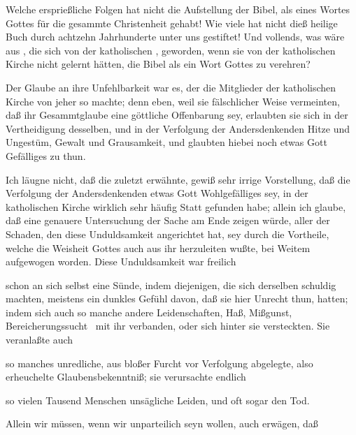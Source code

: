\begin{aufza}
\begin{aufzb}
\end{aufzb}
\item Welche ersprießliche Folgen hat nicht die Aufstellung der Bibel, als eines Wortes Gottes für die gesammte Christenheit gehabt! Wie viele  hat nicht dieß heilige Buch durch achtzehn Jahrhunderte unter uns gestiftet! Und vollends, was wäre aus , die sich von der katholischen , geworden, wenn sie von der katholischen Kirche nicht gelernt hätten, die Bibel als ein Wort Gottes zu verehren?~
\end{aufza}

 Der Glaube an ihre Unfehlbarkeit war es, der die Mitglieder der katholischen Kirche von jeher so  machte; denn eben, weil sie fälschlicher Weise vermeinten, daß ihr Gesammtglaube eine göttliche Offenbarung sey, erlaubten sie sich in der Vertheidigung desselben, und in der Verfolgung der Andersdenkenden Hitze und Ungestüm, Gewalt und Grausamkeit, und glaubten hiebei noch etwas Gott Gefälliges zu thun.\par
{} Ich läugne nicht, daß die zuletzt erwähnte, gewiß sehr irrige Vorstellung, daß die Verfolgung der Andersdenkenden etwas Gott Wohlgefälliges sey, in der katholischen Kirche wirklich sehr häufig Statt gefunden habe; allein ich glaube, daß eine genauere Untersuchung der Sache am Ende zeigen würde, aller der Schaden, den diese Unduldsamkeit angerichtet hat, sey durch die Vortheile, welche die Weisheit Gottes auch aus ihr herzuleiten wußte, bei Weitem aufgewogen worden. Diese Unduldsamkeit war freilich
\begin{aufzb}
\item schon an sich selbst eine Sünde, indem diejenigen, die sich derselben schuldig machten, meistens ein dunkles Gefühl davon, daß sie hier Unrecht thun, hatten; indem sich auch so manche andere Leidenschaften, Haß, Mißgunst, Bereicherungssucht \udgl\  mit ihr verbanden, oder sich hinter sie versteckten. Sie veranlaßte auch
\item so manches unredliche, aus bloßer Furcht vor Verfolgung abgelegte, also erheuchelte Glaubensbekenntniß; sie verursachte endlich
\item so vielen Tausend Menschen unsägliche Leiden, und oft sogar den Tod.
\end{aufzb}
Allein wir müssen, wenn wir unparteilich seyn wollen, auch erwägen, daß
